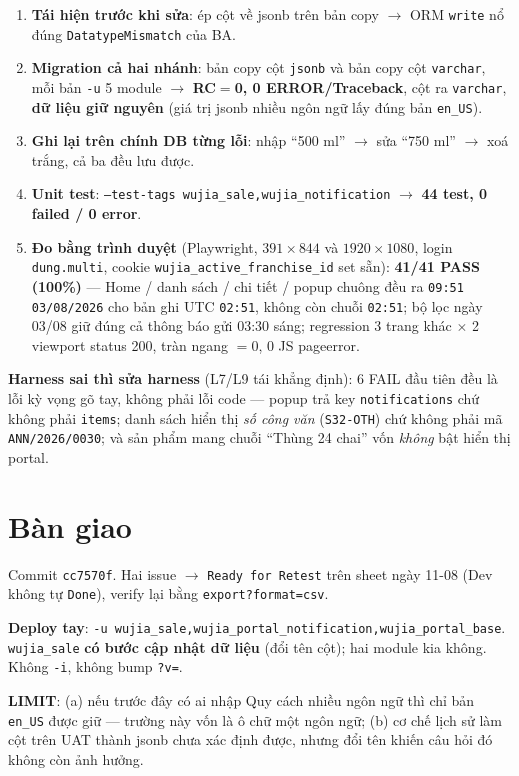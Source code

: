 \begin{enumerate}
  \item \textbf{Tái hiện trước khi sửa}: ép cột về jsonb trên bản copy $\rightarrow$ ORM
    \texttt{write} nổ đúng \texttt{DatatypeMismatch} của BA.
  \item \textbf{Migration cả hai nhánh}: bản copy cột \texttt{jsonb} và bản copy cột
    \texttt{varchar}, mỗi bản \texttt{-u} 5 module $\rightarrow$ \textbf{RC$=$0, 0 ERROR/Traceback},
    cột ra \texttt{varchar}, \textbf{dữ liệu giữ nguyên} (giá trị jsonb nhiều ngôn ngữ lấy đúng
    bản \texttt{en\_US}).
  \item \textbf{Ghi lại trên chính DB từng lỗi}: nhập ``500 ml'' $\rightarrow$ sửa ``750 ml''
    $\rightarrow$ xoá trắng, cả ba đều lưu được.
  \item \textbf{Unit test}: \texttt{--test-tags wujia\_sale,wujia\_notification} $\rightarrow$
    \textbf{44 test, 0 failed / 0 error}.
  \item \textbf{Đo bằng trình duyệt} (Playwright, $391\times844$ và $1920\times1080$, login
    \texttt{dung.multi}, cookie \texttt{wujia\_active\_franchise\_id} set sẵn):
    \textbf{41/41 PASS (100\%)} --- Home / danh sách / chi tiết / popup chuông đều ra
    \texttt{09:51 03/08/2026} cho bản ghi UTC \texttt{02:51}, không còn chuỗi \texttt{02:51};
    bộ lọc ngày 03/08 giữ đúng cả thông báo gửi 03:30 sáng; regression 3 trang khác
    $\times$ 2 viewport status 200, tràn ngang $=0$, 0 JS pageerror.
\end{enumerate}

\textbf{Harness sai thì sửa harness} (L7/L9 tái khẳng định): 6 FAIL đầu tiên đều là lỗi kỳ vọng
gõ tay, không phải lỗi code --- popup trả key \texttt{notifications} chứ không phải
\texttt{items}; danh sách hiển thị \emph{số công văn} (\texttt{S32-OTH}) chứ không phải mã
\texttt{ANN/2026/0030}; và sản phẩm mang chuỗi ``Thùng 24 chai'' vốn \emph{không} bật hiển thị
portal.

\section{Bàn giao}

Commit \texttt{cc7570f}. Hai issue $\rightarrow$ \texttt{Ready for Retest} trên sheet ngày 11-08
(Dev không tự \texttt{Done}), verify lại bằng \texttt{export?format=csv}.

\textbf{Deploy tay}: \texttt{-u wujia\_sale,wujia\_portal\_notification,wujia\_portal\_base}.
\texttt{wujia\_sale} \textbf{có bước cập nhật dữ liệu} (đổi tên cột); hai module kia không.
Không \texttt{-i}, không bump \texttt{?v=}.

\textbf{LIMIT}: (a) nếu trước đây có ai nhập Quy cách nhiều ngôn ngữ thì chỉ bản \texttt{en\_US}
được giữ --- trường này vốn là ô chữ một ngôn ngữ; (b) cơ chế lịch sử làm cột trên UAT thành
jsonb chưa xác định được, nhưng đổi tên khiến câu hỏi đó không còn ảnh hưởng.
